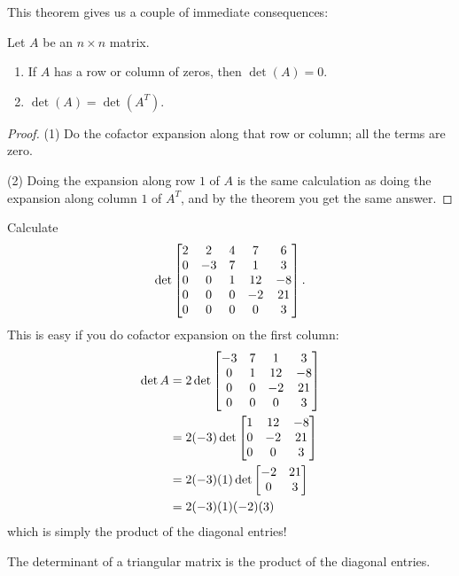 
This theorem gives us a couple of immediate consequences:

\begin{proposition}
Let $A$ be an $n\times n$ matrix.
\begin{enumerate}[(1)]
\item If $A$ has a row or column of zeros, then $\det(A) = 0$.
\item $\det(A) = \det(A^T)$.
\end{enumerate}
\end{proposition}

\begin{proof}
(1) Do the cofactor expansion along that row or column; all the terms are zero.

(2) Doing the expansion along row $1$ of $A$ is the same calculation
as doing the expansion along column $1$ of $A^T$, and by the 
theorem you get the same answer. 
\end{proof}


\begin{myexample}
Calculate 
$$
\det \left[ \begin{matrix} 
2 & 2 & 4 & 7 & 6\\
0 & -3 & 7 & 1 & 3\\
0 & 0 & 1 & 12 & -8\\
0 & 0 & 0 & -2 & 21\\
0 & 0 & 0 & 0  & 3 \end{matrix} \right].
$$
This is easy if you do cofactor expansion on the first column:
\begin{align*}
\det A &= 2 \det\left[ \begin{matrix} -3 & 7 & 1 & 3\\ 0 & 1 & 12 & -8 \\ 0 & 0 & -2 & 21\\ 0 & 0 & 0 & 3 \end{matrix} \right] \\
&= 2 (-3) \det\left[ \begin{matrix} 1 & 12 & -8\\ 0 & -2 & 21\\ 0 & 0 & 3 \end{matrix} \right]\\
&= 2(-3)(1) \det\left[ \begin{matrix} -2 & 21 \\ 0 & 3 \end{matrix} \right]\\
&= 2(-3)(1)(-2)(3)
\end{align*}
which is simply the product of the diagonal entries!
\end{myexample}

\begin{proposition}
The determinant of a triangular matrix is  the product of
the diagonal entries.
\end{proposition}

